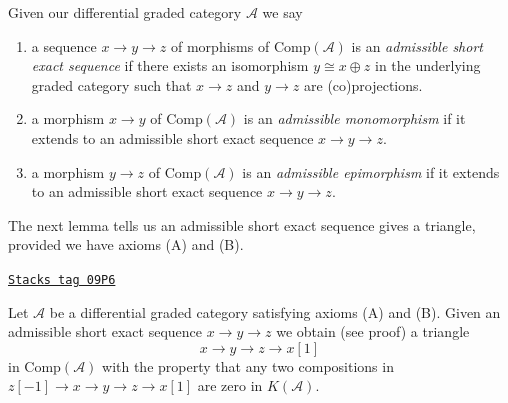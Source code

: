 Given our differential graded category $\mathcal{A}$ we say
\begin{enumerate}
\item a sequence $x \to y \to z$ of morphisms of $\text{Comp}(\mathcal{A})$
is an {\it admissible short exact sequence} if there exists
an isomorphism $y \cong x \oplus z$ in the underlying graded category
such that $x \to z$ and $y \to z$ are (co)projections.
\item a morphism $x\to y$ of $\text{Comp}(\mathcal{A})$ is an
{\it admissible monomorphism} if it extends to an
admissible short exact sequence $x\to y\to z$.
\item a morphism $y\to z$ of $\text{Comp}(\mathcal{A})$ is an
{\it admissible epimorphism} if it extends to an
admissible short exact sequence $x\to y\to z$.
\end{enumerate}
The next lemma tells us an admissible short exact sequence gives a
triangle, provided we have axioms (A) and (B).

\begin{lemma}
\label{dga-lemma-get-triangle}
\href{https://stacks.math.columbia.edu/tag/09P6}{\texttt{Stacks tag 09P6}}

Let $\mathcal{A}$ be a differential graded category satisfying
axioms (A) and (B). Given an admissible short exact sequence
$x \to y \to z$ we obtain (see proof) a triangle
$$
x \to y \to z \to x[1]
$$
in $\text{Comp}(\mathcal{A})$ with the property that any two compositions
in $z[-1] \to x \to y \to z \to x[1]$ are zero in $K(\mathcal{A})$.
\end{lemma}

